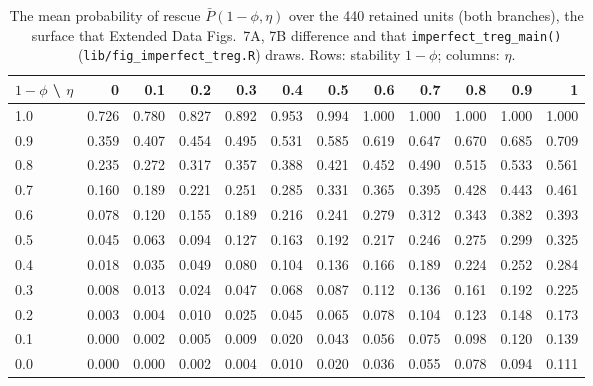 \documentclass[11pt]{article}
\begin{document}
\begin{table}[H]
\centering
\caption{The mean probability of rescue $\bar P(1-\phi,\eta)$ over the 440
retained units (both branches), the surface that Extended Data Figs.~7A, 7B difference and that
\texttt{imperfect\_treg\_main()} (\texttt{lib/fig\_imperfect\_treg.R}) draws. Rows: stability $1-\phi$;
columns: $\eta$.
}
\label{tab:imp-surface}
\small
\begin{tabular}{l*{11}{r}}
\toprule
$1-\phi$ \textbackslash{} $\eta$ & 0 & 0.1 & 0.2 & 0.3 & 0.4 & 0.5 & 0.6 & 0.7 & 0.8 & 0.9 & 1\\
\midrule
1.0 & 0.726 & 0.780 & 0.827 & 0.892 & 0.953 & 0.994 & 1.000 & 1.000 & 1.000 & 1.000 & 1.000\\
0.9 & 0.359 & 0.407 & 0.454 & 0.495 & 0.531 & 0.585 & 0.619 & 0.647 & 0.670 & 0.685 & 0.709\\
0.8 & 0.235 & 0.272 & 0.317 & 0.357 & 0.388 & 0.421 & 0.452 & 0.490 & 0.515 & 0.533 & 0.561\\
0.7 & 0.160 & 0.189 & 0.221 & 0.251 & 0.285 & 0.331 & 0.365 & 0.395 & 0.428 & 0.443 & 0.461\\
0.6 & 0.078 & 0.120 & 0.155 & 0.189 & 0.216 & 0.241 & 0.279 & 0.312 & 0.343 & 0.382 & 0.393\\
0.5 & 0.045 & 0.063 & 0.094 & 0.127 & 0.163 & 0.192 & 0.217 & 0.246 & 0.275 & 0.299 & 0.325\\
0.4 & 0.018 & 0.035 & 0.049 & 0.080 & 0.104 & 0.136 & 0.166 & 0.189 & 0.224 & 0.252 & 0.284\\
0.3 & 0.008 & 0.013 & 0.024 & 0.047 & 0.068 & 0.087 & 0.112 & 0.136 & 0.161 & 0.192 & 0.225\\
0.2 & 0.003 & 0.004 & 0.010 & 0.025 & 0.045 & 0.065 & 0.078 & 0.104 & 0.123 & 0.148 & 0.173\\
0.1 & 0.000 & 0.002 & 0.005 & 0.009 & 0.020 & 0.043 & 0.056 & 0.075 & 0.098 & 0.120 & 0.139\\
0.0 & 0.000 & 0.000 & 0.002 & 0.004 & 0.010 & 0.020 & 0.036 & 0.055 & 0.078 & 0.094 & 0.111\\
\bottomrule
\end{tabular}
\end{table}
\end{document}
